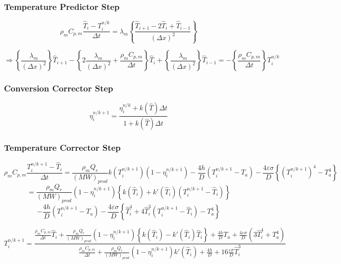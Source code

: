 \documentclass[../main.tex]{subfiles}
\begin{document}
\subsubsection{Temperature Predictor Step}

$$
\rho_m C_{p,m} \frac{\hat{T}_i - T^{n/k}_i}{\Delta t} =
\lambda_m \left\{ \frac{\hat{T}_{i+1} - 2\hat{T}_i + \hat{T}_{i-1}}{\left(\Delta x\right)^2} \right\}
$$

\begin{equation}
    \Rightarrow
    \left\{ \frac{\lambda_m}{\left(\Delta x\right)^2} \right\} \hat{T}_{i+1} -
    \left\{ 2\frac{\lambda_m}{\left(\Delta x\right)^2} + \frac{\rho_m C_{p,m}}{\Delta t} \right\} \hat{T}_i +
    \left\{ \frac{\lambda_m}{\left(\Delta x\right)^2} \right\} \hat{T}_{i-1} =
    - \left\{ \frac{\rho_m C_{p,m}}{\Delta t} \right\} T^{n/k}_i
\end{equation}

\subsubsection{Conversion Corrector Step}

\begin{equation}
    \eta^{n/k+1}_i = \frac{\eta^{n/k}_i + k \left(\hat{T}\right)\Delta t}{1 + k\left(\hat{T}\right)\Delta t}
\end{equation}

\subsubsection{Temperature Corrector Step}

$$
    \rho_m C_{p,m} \frac{T^{n/k+1}_i - \hat{T}_i}{\Delta t} = 
    \frac{\rho_m Q_r}{\left( MW \right)_{prod}} k\left( T^{n/k+1}_i \right) \left( 1 - \eta_i^{n/k+1} \right) -
    \frac{4h}{D} \left( T^{n/k+1}_i - T_a \right) -
    \frac{4 \varepsilon \sigma}{D} \left\{ \left( T^{n/k+1}_i \right)^4 - T_a^4 \right\}
$$
$$
    = \frac{\rho_m Q_r}{\left( MW \right)_{prod}} \left( 1 - \eta_i^{n/k+1} \right) \left\{ k\left(\hat{T}_i\right) + k'\left(\hat{T}_i\right)\left(T^{n/k+1}_i - \hat{T}_i\right) \right\}
$$
$$
    - \frac{4h}{D} \left( T^{n/k+1}_i - T_a \right)
    - \frac{4 \varepsilon \sigma}{D} \left\{ \hat{T}^4_i + 4\hat{T}^3_i\left( T^{n/k+1}_i - \hat{T}_i\right) - T_a^4 \right\}
$$

\begin{equation}
    T^{n/k+1}_i = 
    \frac{ \frac{\rho_m C_{p,m}}{\Delta t} \hat{T}_i +
    \frac{\rho_m Q_r}{\left( MW \right)_{prod}} \left( 1 - \eta_i^{n/k+1} \right) \left\{ k\left(\hat{T}_i\right) - k'\left(\hat{T}_i\right)\hat{T}_i \right\} +
    \frac{4h}{D} T_a +
    \frac{4 \varepsilon \sigma}{D} \left( 3\hat{T}^4_i + T_a^4 \right)}
    {\frac{\rho_m C_{p,m}}{\Delta t} +
    \frac{\rho_m Q_r}{\left( MW \right)_{prod}} \left( 1 - \eta_i^{n/k+1} \right) k'\left(\hat{T}_i\right) + 
    \frac{4h}{D} + 
    16 \frac{\varepsilon \sigma}{D} \hat{T}^3_i}
\end{equation}
\end{document}

